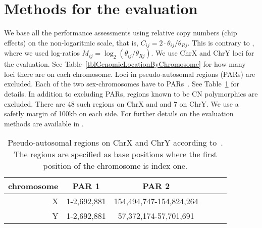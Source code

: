 \documentclass[10pt,a4paper]{article}
\begin{document}
\section{Methods for the evaluation}
We base all the performance assessments using relative copy numbers (chip effects) on the non-logaritmic scale, that is, $C_{ij}=2\cdot\theta_{ij}/\theta_{Rj}$.  This is contrary to \cite{BengtssonH_etal_2008a}, where we used log-ratios $M_{ij}=\log_2(\theta_{ij}/\theta_{Rj})$.  
We use ChrX and ChrY loci for the evaluation.  See Table~\ref{tblGenomicLocationByChromosome} for how many loci there are on each chromosome.
Loci in pseudo-autosomal regions (PARs) are excluded.  Each of the two sex-chromosomes have to PARs~\citep{BlaschkeRappold_2006}.  See Table~\ref{tblPARs} for details.
In addition to excluding PARs, regions known to be CN polymorphics \citep{RedonR_etal_2006} are excluded.  There are 48 such regions on ChrX and and 7 on ChrY.  We use a safetly margin of 100kb on each side.
For further details on the evaluation methods are available in \cite{BengtssonH_etal_2008a}.

\begin{table}[htp]
\begin{center}
\begin{tabular}{|r|c|c|c|cc|}
\hline
chromosome & PAR 1 & PAR 2 \\
\hline
\hline
X  & 1-2,692,881 & 154,494,747-154,824,264 \\
Y  & 1-2,692,881 &  57,372,174-57,701,691 \\
\hline
\end{tabular}
\end{center}
\caption{Pseudo-autosomal regions on ChrX and ChrY according to~\citet{BlaschkeRappold_2006}.  The regions are specified as base positions where the first position of the chromosome is index one.}
\label{tblPARs}
\end{table}
\end{document}
